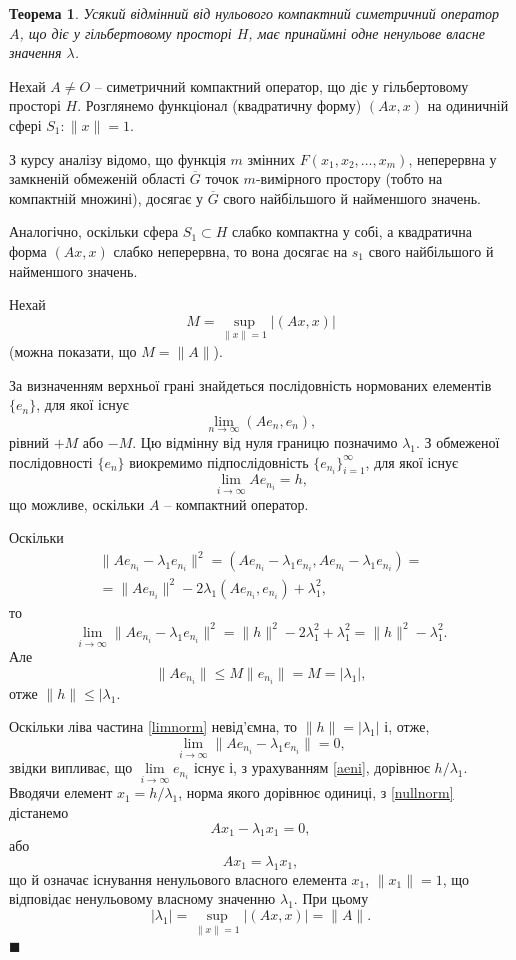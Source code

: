 \documentclass[14pt,twoside]{extreport}
\theoremstyle{mystyle}
\newtheorem{thm}{Теорема}
\renewenvironment{proof}{{\bfseries Доведення.}}{$\blacksquare$}
\numberwithin{equation}{chapter}
\begin{document}
\begin{thm}\label{existeigen}
 Усякий відмінний від нульового компактний симетричний оператор $A$, що діє у гільбертовому просторі $H$, має принаймні одне  ненульове власне значення $\lambda$.
\end{thm}
\begin{proof}
Нехай $A \neq O$ -- симетричний компактний оператор, що діє у гільбертовому просторі $H$. Розглянемо функціонал (квадратичну форму) $(Ax, x)$ на одиничній сфері $S_1: \| x\| = 1$.

З курсу аналізу відомо, що функція $m$ змінних $F(x_1, x_2, \ldots, x_m)$, неперервна у замкненій обмеженій області $\overline{G}$ точок $m$-вимірного простору (тобто на компактній множині), досягає у $\overline{G}$ свого найбільшого й найменшого значень.

Аналогічно, оскільки сфера $S_1 \subset H$ слабко компактна у собі, а квадратична форма $(Ax, x)$ слабко неперервна, то вона досягає на $s_1$ свого найбільшого й найменшого значень.

Нехай
\[
 M = \sup\limits_{\|x\|=1} |(Ax, x)|
\]
(можна показати, що $M = \|A\|$).

За визначенням верхньої грані знайдеться послідовність нормованих елементів $\{e_n\}$, для якої існує
\[
 \lim\limits_{n\to\infty}(Ae_n, e_n),
\]
рівний $+M$ або $-M$. Цю відмінну від нуля границю позначимо $\lambda_1$. З обмеженої послідовності $\{e_n\}$ виокремимо підпослідовність $\{e_{n_i}\}_{i=1}^{\infty}$, для якої існує
\begin{equation}\label{aeni}
 \lim\limits_{i\to\infty}Ae_{n_i} =h,
\end{equation}
що можливе, оскільки $A$ -- компактний оператор.

Оскільки
\begin{multline*}
 \|Ae_{n_i} - \lambda_1 e_{n_i}\|^2=(Ae_{n_i} - \lambda_1 e_{n_i}, Ae_{n_i} - \lambda_1 e_{n_i})=\\
=\|Ae_{n_i}\|^2 - 2\lambda_1 (Ae_{n_i}, e_{n_i}) + \lambda_1^2,
\end{multline*}
то
\begin{equation}\label{limnorm}
 \lim\limits_{i\to\infty} \|Ae_{n_i} - \lambda_1e_{n_i}\|^2 = \|h\|^2 - 2\lambda_1^2 + \lambda_1^2 = \|h\|^2 - \lambda_1^2.
\end{equation}
Але
\[
 \|Ae_{n_i}\|\leqslant M\|e_{n_i}\| = M = |\lambda_1|,
\]
отже $\|h\| \leqslant |\lambda_1$.

Оскільки ліва частина \eqref{limnorm} невід'ємна, то $\|h\| = |\lambda_1|$ і, отже,
\begin{equation}\label{nullnorm}
 \lim\limits_{i\to\infty} \|Ae_{n_i} - \lambda_1 e_{n_i}\| =0,
\end{equation}
звідки випливає, що $\lim\limits_{i\to\infty} e_{n_i}$ існує і, з урахуванням \eqref{aeni}, дорівнює $h/\lambda_1$. Вводячи елемент $x_1=h/\lambda_1$, норма якого дорівнює одиниці, з \eqref{nullnorm} дістанемо
\[
 Ax_1 - \lambda_1x_1 = 0,
\]
або
\[
 Ax_1 = \lambda_1 x_1,
\]
що й означає існування ненульового власного елемента $x_1$, $\|x_1\|=1$, що відповідає ненульовому власному значенню $\lambda_1$. При цьому
\[
 |\lambda_1| = \sup\limits_{\|x\|=1} |(Ax, x)| = \|A\|.
\]
\end{proof}
\end{document}
